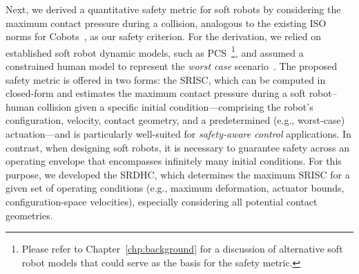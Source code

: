 Next, we derived a quantitative safety metric for soft robots by considering the maximum contact pressure during a collision, analogous to the existing ISO norms for \glspl{Cobot}~\citep{iso2016collaborative}, as our safety criterion. For the derivation, we relied on established soft robot dynamic models, such as \gls{PCS}~\citep{renda2018discrete}\footnote{Please refer to Chapter~\ref{chp:background} for a discussion of alternative soft robot models that could serve as the basis for the safety metric.}, and assumed a constrained human model to represent the \emph{worst case} scenario~\citep{haddadin2009requirements}. The proposed safety metric is offered in two forms: the \gls{SRISC}, which can be computed in closed-form and estimates the maximum contact pressure during a soft robot–human collision given a specific initial condition—comprising the robot’s configuration, velocity, contact geometry, and a predetermined (e.g., worst-case) actuation—and is particularly well-suited for \emph{safety-aware control} applications. In contrast, when designing soft robots, it is necessary to guarantee safety across an operating envelope that encompasses infinitely many initial conditions. For this purpose, we developed the \gls{SRDHC}, which determines the maximum \gls{SRISC} for a given set of operating conditions (e.g., maximum deformation, actuator bounds, configuration-space velocities), especially considering all potential contact geometries.

